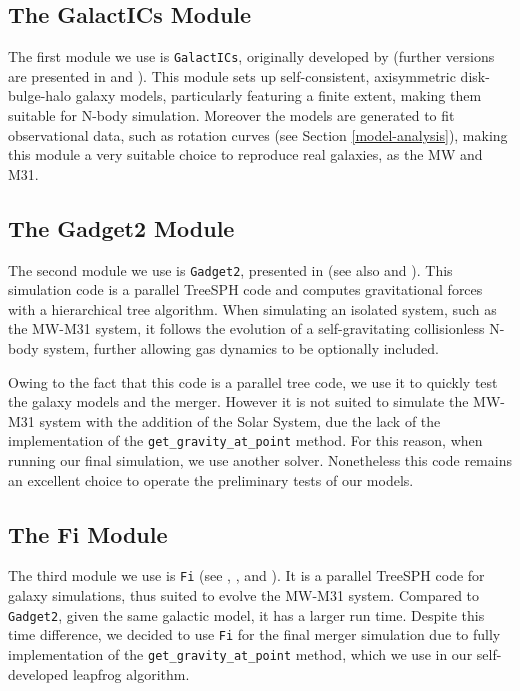 \documentclass[a4paper,12pt, english]{article}
\begin{document}
\subsection{The GalactICs Module}
\label{galactics}
The first module we use is \texttt{GalactICs}, originally developed by \textcite{Kuijken_1995} (further versions are presented in \textcite{Widrow_2005} and \textcite{Widrow_2008}). This module sets up self-consistent, axisymmetric disk-bulge-halo galaxy models, particularly featuring a finite extent, making them suitable for N-body simulation. Moreover the models are generated to fit observational data, such as rotation curves (see Section \ref{model-analysis}), making this module a very suitable choice to reproduce real galaxies, as the MW and M31.\par
\smallskip

\subsection{The Gadget2 Module}
\label{gadget2}
The second module we use is \texttt{Gadget2}, presented in \textcite{Springel_2005} (see also \textcite{Springel_2001} and \textcite{Durier_2012}). This simulation code is a parallel TreeSPH code and computes gravitational forces with a hierarchical tree algorithm. When simulating an isolated system, such as the MW-M31 system, it follows the evolution of a self-gravitating collisionless N-body system, further allowing gas dynamics to be optionally included.\par
\smallskip
Owing to the fact that this code is a parallel tree code, we use it to quickly test the galaxy models and the merger. However it is not suited to simulate the MW-M31 system with the addition of the Solar System, due the lack of the implementation of the \texttt{get\_gravity\_at\_point} method. For this reason, when running our final simulation, we use another solver. Nonetheless this code remains an excellent choice to operate the preliminary tests of our models.\par
\smallskip

\subsection{The Fi Module}
\label{fi}
The third module we use is \texttt{Fi} (see \textcite{Hernquist_1989}, \textcite{Gerritsen_1999}, \textcite{Pelupessy_2004} and \textcite{Pelupessy_2005}). It is a parallel TreeSPH code for galaxy simulations, thus suited to evolve the MW-M31 system. Compared to \texttt{Gadget2}, given the same galactic model, it has a larger run time. Despite this time difference, we decided to use \texttt{Fi} for the final merger simulation due to fully implementation of the \texttt{get\_gravity\_at\_point} method, which we use in our self-developed leapfrog algorithm.\par
\smallskip
\end{document}
